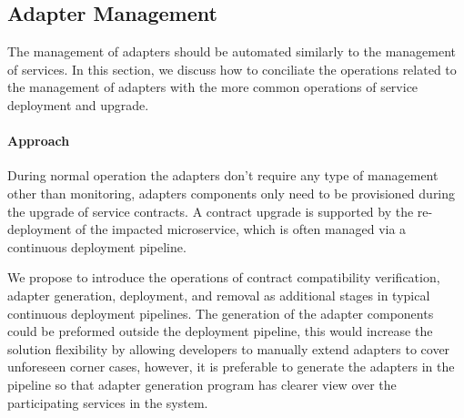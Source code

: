 \subsection{Adapter Management} %
\label{sec:adapter_management}

The management of adapters should be automated similarly to the management of services.
In this section, we discuss how to conciliate the operations related to the management of adapters with the more common operations of service deployment and upgrade.

\paragraph{Approach}
During normal operation the adapters don't require any type of management other than monitoring,
adapters components only need to be provisioned during the upgrade of service contracts.
A contract upgrade is supported by the re-deployment of the impacted microservice, which is often managed via a continuous deployment pipeline.

We propose to introduce the operations of contract compatibility verification, adapter generation, deployment,
and removal as additional stages in typical continuous deployment pipelines.
The generation of the adapter components could be preformed outside the deployment pipeline,
this would increase the solution flexibility by allowing developers to manually extend adapters to cover unforeseen corner cases,
however, it is preferable to generate the adapters in the pipeline so that adapter generation program has clearer view
over the participating services in the system.